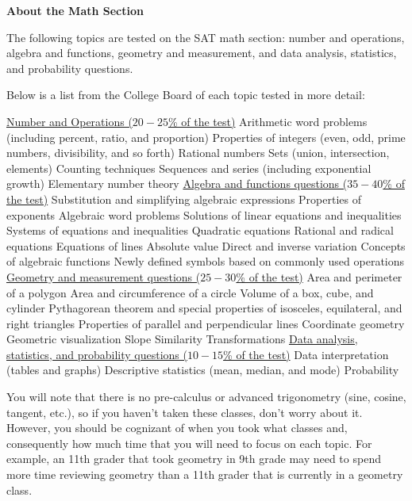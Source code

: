 \bigskip
\textbf{\large About the Math Section}

The following topics are tested on the SAT math section: number and operations, algebra and functions, geometry and measurement, and data analysis, statistics, and probability questions. 

\bigskip
Below is a list from the College Board of each topic tested in more detail:

\bigskip
\begin{outline}
\0 \underline{Number and Operations ($20-25$\% of the test)}
\1 Arithmetic word problems (including percent, ratio, and proportion)
\1 Properties of integers (even, odd, prime numbers, divisibility, and so forth)
\1 Rational numbers
\1 Sets (union, intersection, elements)
\1 Counting techniques
\1 Sequences and series (including exponential growth)
\1 Elementary number theory
\0 \underline{Algebra and functions questions ($35-40$\% of the test)}
\1 Substitution and simplifying algebraic expressions
\1 Properties of exponents
\1 Algebraic word problems
\1 Solutions of linear equations and inequalities
\1 Systems of equations and inequalities
\1 Quadratic equations
\1 Rational and radical equations
\1 Equations of lines
\1 Absolute value
\1 Direct and inverse variation
\1 Concepts of algebraic functions
\1 Newly defined symbols based on commonly used operations
\0 \underline{Geometry and measurement questions ($25-30$\% of the test)}
\1 Area and perimeter of a polygon
\1 Area and circumference of a circle
\1 Volume of a box, cube, and cylinder
\1 Pythagorean theorem and special properties of isosceles, equilateral, and right triangles
\1 Properties of parallel and perpendicular lines
\1 Coordinate geometry
\1 Geometric visualization
\1 Slope
\1 Similarity
\1 Transformations
\0 \underline{Data analysis, statistics, and probability questions ($10-15$\% of the test)}
\1 Data interpretation (tables and graphs)
\1 Descriptive statistics (mean, median, and mode)
\1 Probability
\end{outline}

You will note that there is no pre-calculus or advanced trigonometry (sine, cosine, tangent, etc.), so if you haven't taken these classes, don't worry about it. However, you should be cognizant of when you took what classes and, consequently how much time that you will need to focus on each topic. For example, an 11th grader that took geometry in 9th grade may need to spend more time reviewing geometry than a 11th grader that is currently in a geometry class.

